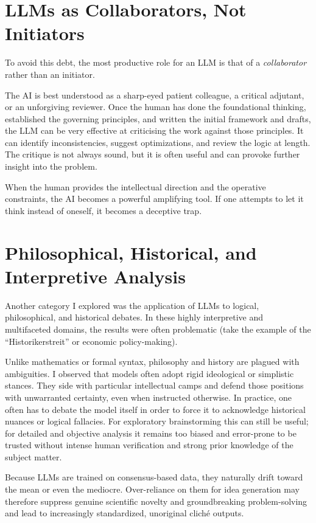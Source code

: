 \documentclass[10pt,a4paper]{article}
\begin{document}
\section{LLMs as Collaborators, Not Initiators}
To avoid this debt, the most productive role for an LLM is that of a \emph{collaborator} rather than an initiator.

The AI is best understood as a sharp-eyed patient colleague, a critical adjutant, or an unforgiving reviewer. Once the human has done the foundational thinking, established the governing principles, and written the initial framework and drafts, the LLM can be very effective at criticising the work against those principles. It can identify inconsistencies, suggest optimizations, and review the logic at length. The critique is not always sound, but it is often useful and can provoke further insight into the problem.

When the human provides the intellectual direction and the operative constraints, the AI becomes a powerful amplifying tool. If one attempts to let it think instead of oneself, it becomes a deceptive trap.

\section{Philosophical, Historical, and Interpretive Analysis}
Another category I explored was the application of LLMs to logical, philosophical, and historical debates. In these highly interpretive and multifaceted domains, the results were often problematic (take the example of the ``Historikerstreit'' or economic policy-making).

Unlike mathematics or formal syntax, philosophy and history are plagued with ambiguities. I observed that models often adopt rigid ideological or simplistic stances. They side with particular intellectual camps and defend those positions with unwarranted certainty, even when instructed otherwise. In practice, one often has to debate the model itself in order to force it to acknowledge historical nuances or logical fallacies. For exploratory brainstorming this can still be useful; for detailed and objective analysis it remains too biased and error-prone to be trusted without intense human verification and strong prior knowledge of the subject matter.

Because LLMs are trained on consensus-based data, they naturally drift toward the mean or even the mediocre. Over-reliance on them for idea generation may therefore suppress genuine scientific novelty and groundbreaking problem-solving and lead to increasingly standardized, unoriginal clich\'{e} outputs.
\end{document}
